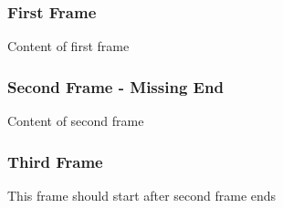 \documentclass{beamer}
\begin{document}
\begin{frame}
\frametitle{First Frame}
Content of first frame
\end{frame}

\begin{frame}
\frametitle{Second Frame - Missing End}
Content of second frame
\end{frame}

\begin{frame}
\frametitle{Third Frame}
This frame should start after second frame ends
\end{frame}
\end{document}
